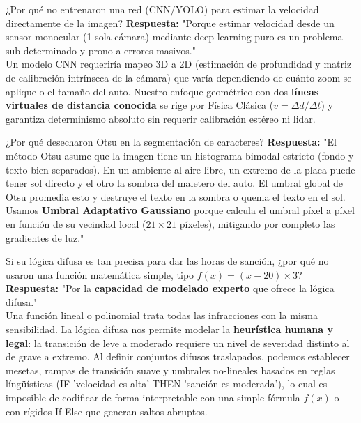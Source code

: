 \documentclass[11pt,a4paper]{article}
\begin{document}
\begin{trampa}{¿Por qu\'e no entrenaron una red (CNN/YOLO) para estimar la velocidad directamente de la imagen?}
    \textbf{Respuesta:} "Porque estimar velocidad desde un sensor monocular (1 sola c\'amara) mediante deep learning puro es un problema sub-determinado y prono a errores masivos."\\
    Un modelo CNN requerir\'ia mapeo 3D a 2D (estimaci\'on de profundidad y matriz de calibraci\'on intr\'inseca de la c\'amara) que var\'ia dependiendo de cu\'anto zoom se aplique o el tama\~no del auto. Nuestro enfoque geom\'etrico con dos \textbf{l\'ineas virtuales de distancia conocida} se rige por F\'isica Cl\'asica ($v = \Delta d / \Delta t$) y garantiza determinismo absoluto sin requerir calibraci\'on est\'ereo ni lidar.
\end{trampa}

\begin{pregunta}{¿Por qu\'e desecharon Otsu en la segmentaci\'on de caracteres?}
    \textbf{Respuesta:} "El m\'etodo Otsu asume que la imagen tiene un histograma bimodal estricto (fondo y texto bien separados). En un ambiente al aire libre, un extremo de la placa puede tener sol directo y el otro la sombra del maletero del auto. El umbral global de Otsu promedia esto y destruye el texto en la sombra o quema el texto en el sol. Usamos \textbf{Umbral Adaptativo Gaussiano} porque calcula el umbral p\'ixel a p\'ixel en funci\'on de su vecindad local ($21\times 21$ píxeles), mitigando por completo las gradientes de luz."
\end{pregunta}

\begin{trampa}{Si su l\'ogica difusa es tan precisa para dar las horas de sanci\'on, ¿por qu\'e no usaron una funci\'on matem\'atica simple, tipo $f(x) = (x - 20) \times 3$?}
    \textbf{Respuesta:} "Por la \textbf{capacidad de modelado experto} que ofrece la l\'ogica difusa." \\
    Una funci\'on lineal o polinomial trata todas las infracciones con la misma sensibilidad. La l\'ogica difusa nos permite modelar la \textbf{heur\'istica humana y legal}: la transici\'on de leve a moderado requiere un nivel de severidad distinto al de grave a extremo. Al definir conjuntos difusos traslapados, podemos establecer mesetas, rampas de transici\'on suave y umbrales no-lineales basados en reglas l\'ingü\'isticas (IF 'velocidad es alta' THEN 'sanción es moderada'), lo cual es imposible de codificar de forma interpretable con una simple f\'ormula $f(x)$ o con r\'igidos If-Else que generan saltos abruptos.
\end{trampa}
\end{document}
